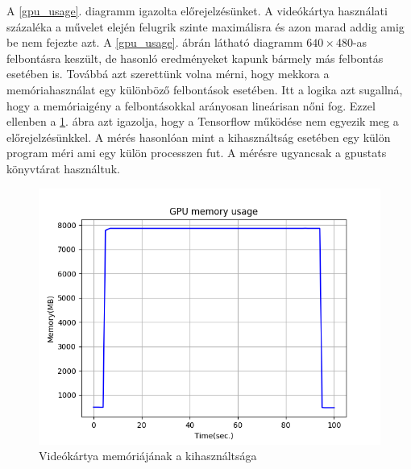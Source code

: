 \documentclass[12pt, a4paper, oneside]{book}
\theoremstyle{tetel}
\begin{document}
A \ref{gpu_usage}. diagramm igazolta előrejelzésünket. A videókártya használati százaléka a művelet elején felugrik szinte maximálisra és azon marad addig amig be nem fejezte azt. A \ref{gpu_usage}. ábrán látható diagramm $640 \times $480-as felbontásra keszült, de hasonló eredményeket kapunk bármely más felbontás esetében is.
\newline
\indent
Továbbá azt szerettünk volna mérni, hogy mekkora a memóriahasználat egy különböző felbontások esetében. Itt a logika azt sugallná, hogy a memóriaigény a felbontásokkal arányosan lineárisan nőni fog. Ezzel ellenben a \ref{gpu_memory_usage}. ábra azt igazolja, hogy a Tensorflow működése nem egyezik meg a előrejelzésünkkel. A mérés hasonlóan mint a kihasználtság esetében egy külön program méri ami egy külön processzen fut. A mérésre ugyancsak a gpustats könyvtárat használtuk.

\begin{figure}[!htbp]
	\begin{center}
		\includegraphics[scale=0.8]{gpu_memory_usage.png}
		\caption{Videókártya memóriájának a kihasználtsága}
		\label{gpu_memory_usage}
	\end{center}
\end{figure} 
\end{document}
